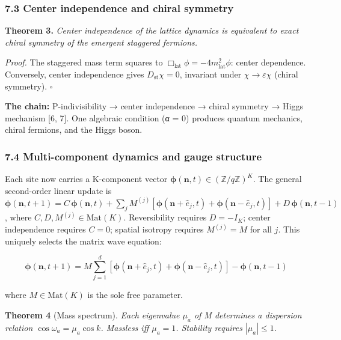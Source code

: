 \documentclass[
  11pt,
]{article}
\begin{document}
\hypertarget{center-independence-and-chiral-symmetry}{%
\subsubsection{7.3 Center independence and chiral
symmetry}\label{center-independence-and-chiral-symmetry}}

\textbf{Theorem 3.} \emph{Center independence of the lattice dynamics is
equivalent to exact chiral symmetry of the emergent staggered fermions.}

\emph{Proof.} The staggered mass term squares to
\(\Box_{\text{lat}}\phi = -4m_{\text{lat}}^2\phi\): center dependence.
Conversely, center independence gives \(D_{\text{st}}\chi = 0\),
invariant under \(\chi \to \varepsilon\chi\) (chiral symmetry).
\(\square\)

\textbf{The chain:} P-indivisibility → center independence → chiral
symmetry → Higgs mechanism {[}6, 7{]}. One algebraic condition (α = 0)
produces quantum mechanics, chiral fermions, and the Higgs boson.

\hypertarget{multi-component-dynamics-and-gauge-structure}{%
\subsubsection{7.4 Multi-component dynamics and gauge
structure}\label{multi-component-dynamics-and-gauge-structure}}

Each site now carries a K-component vector
\(\boldsymbol{\phi}(\mathbf{n}, t) \in (\mathbb{Z}/q\mathbb{Z})^K\). The
general second-order linear update is
\(\boldsymbol{\phi}(\mathbf{n}, t+1) = C\,\boldsymbol{\phi}(\mathbf{n}, t) + \sum_j M^{(j)}[\boldsymbol{\phi}(\mathbf{n}+\hat{e}_j, t) + \boldsymbol{\phi}(\mathbf{n}-\hat{e}_j, t)] + D\,\boldsymbol{\phi}(\mathbf{n}, t-1)\),
where \(C, D, M^{(j)} \in \mathrm{Mat}(K)\). Reversibility requires
\(D = -I_K\); center independence requires \(C = 0\); spatial isotropy
requires \(M^{(j)} = M\) for all \(j\). This uniquely selects the matrix
wave equation:

\[\boldsymbol{\phi}(\mathbf{n}, t+1) = M \sum_{j=1}^{d} \left[\boldsymbol{\phi}(\mathbf{n} + \hat{e}_j, t) + \boldsymbol{\phi}(\mathbf{n} - \hat{e}_j, t)\right] - \boldsymbol{\phi}(\mathbf{n}, t-1)\]

where \(M \in \mathrm{Mat}(K)\) is the sole free parameter.

\textbf{Theorem 4} (Mass spectrum). \emph{Each eigenvalue \(\mu_a\) of M
determines a dispersion relation \(\cos\omega_a = \mu_a \cos k\).
Massless iff \(\mu_a = 1\). Stability requires \(|\mu_a| \leq 1\).}
\end{document}
